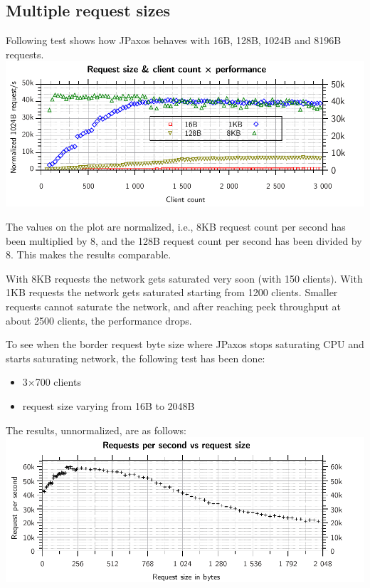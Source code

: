\subsection{Multiple request sizes}

Following test shows how JPaxos behaves with 16B, 128B, 1024B and 8196B requests.\\
\includegraphics{varia/reqSize-cliCount}

The values on the plot are normalized, i.e., 8KB request count per second has been multiplied by 8, and the 128B request count per second has been divided by 8. This makes the results comparable.

With 8KB requests the network gets saturated very soon (with 150 clients).
With 1KB requests the network gets saturated starting from 1200 clients.
Smaller requests cannot saturate the network, and after reaching peek throughput at about 2500 clients, the performance drops.

\bigskip

To see when the border request byte size where JPaxos stops saturating CPU and starts saturating network, the following test has been done:
 \begin{itemize}
 \item 3×700 clients
 \item request size varying from 16B to 2048B
\end{itemize}

The results, unnormalized, are as follows:\\
\includegraphics{varia/reqSize_reqs.pdf}

